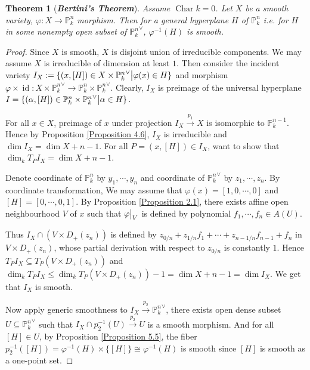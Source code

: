 \documentclass{ctexart}
\newtheorem{theorem}{Theorem}[section]
\newcommand{\identity}{\operatorname{id}}
\newcommand{\characteristic}{\operatorname{Char}}
\begin{document}
\begin{theorem}[\textbf{\emph{Bertini's Theorem}}]
    Assume $\characteristic k = 0$.
    Let $X$ be a smooth variety, $\varphi: X \rightarrow \mathbb{P}_{k}^{n}$ morphism.
    Then for a general hyperplane $H$ of $\mathbb{P}_{k}^{n}$ i.e. for $H$ in some nonempty open subset of ${\mathbb{P}_{k}^{n}}^{\vee}$, $\varphi^{-1}(H)$ is smooth.
    \label{Theorem 5.5}
\end{theorem}
\begin{proof}
    Since $X$ is smooth, $X$ is disjoint union of irreducible components.
    We may assume $X$ is irreducible of dimension at least $1$.
    Then consider the incident variety $I_{X} := \{(x, [H])\in X \times {\mathbb{P}_{k}^{n}}^{\vee} \big{|} \varphi(x)\in H\}$ and morphism $\varphi \times \identity: X \times {\mathbb{P}_{k}^{n}}^{\vee} \rightarrow \mathbb{P}_{k}^{n} \times {\mathbb{P}_{k}^{n}}^{\vee}$.
    Clearly, $I_{X}$ is preimage of the universal hyperplane $I = \{(\alpha, [H])\in \mathbb{P}_{k}^{n} \times {\mathbb{P}_{k}^{n}}^{\vee} \big{|} \alpha\in H\}$.
    \par
    For all $x\in X$, preimage of $x$ under projection $I_{X} \overset{p_{1}}{\rightarrow} X$ is isomorphic to $\mathbb{P}_{k}^{n - 1}$.
    Hence by Proposition \ref{Proposition 4.6}, $I_{X}$ is irreducible and $\dim I_{X} = \dim X + n - 1$.
    For all $P = (x, [H])\in I_{X}$, want to show that $\dim_{k} T_{P}I_{X} = \dim X + n - 1$.
    \par
    Denote coordinate of $\mathbb{P}_{k}^{n}$ by $y_{1}, \cdots, y_{n}$ and coordinate of ${\mathbb{P}_{k}^{n}}^{\vee}$ by $z_{1}, \cdots, z_{n}$.
    By coordinate transformation, We may assume that $\varphi(x) = [1, 0, \cdots, 0]$ and $[H] = [0, \cdots, 0, 1]$.
    By Proposition \ref{Proposition 2.1}, there exists affine open neighbourhood $V$ of $x$ such that $\varphi\big{|}_{V}$ is defined by polynomial $f_{1}, \cdots, f_{n}\in A(U)$.
    \par
    Thus $I_{X} \cap (V \times D_{+}(z_{n}))$ is defined by $z_{0/n} + z_{1/n}f_{1} + \cdots + z_{n - 1/n}f_{n - 1} + f_{n}$ in $V \times D_{+}(z_{n})$,
    whose partial derivation with respect to $z_{0/n}$ is constantly $1$.
    Hence $T_{P}I_{X} \subseteq T_{P}(V \times D_{+}(z_{n}))$ and $\dim_{k} T_{P}I_{X} \le \dim_{k} T_{P}(V \times D_{+}(z_{n})) - 1 = \dim X + n - 1 = \dim I_{X}$.
    We get that $I_{X}$ is smooth.
    \par
    Now apply generic smoothness to $I_{X} \overset{p_{2}}{\rightarrow} {\mathbb{P}_{k}^{n}}^{\vee}$,
    there exists open dense subset $U \subseteq {\mathbb{P}_{k}^{n}}^{\vee}$ such that $I_{X} \cap p_{2}^{-1}(U) \overset{p_{2}}{\rightarrow} U$ is a smooth morphism.
    And for all $[H]\in U$, by Proposition \ref{Proposition 5.5}, the fiber $p_{2}^{-1}([H]) = \varphi^{-1}(H) \times \{[H]\} \cong \varphi^{-1}(H)$ is smooth since $[H]$ is smooth as a one-point set.
\end{proof}
\end{document}
